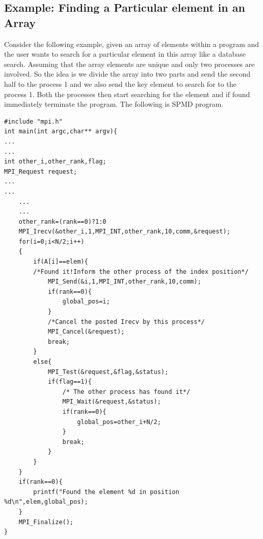 \documentclass[12pt]{book}
\begin{document}
\subsection{Example: Finding a Particular element in an Array}
Consider the following example, given an array of elements within a program and the user wants to search for a particular element in this array like a database search. Assuming that the array elements are unique and only two processes are involved. So the idea is we divide the array into two parts and send the second half to the process 1 and we also send the key element to search for to the process 1. Both the processes then start searching for the element and if found immediately terminate the program. The following is SPMD program.
\begin{lstlisting}
#include "mpi.h"
int main(int argc,char** argv){
...
...
int other_i,other_rank,flag;
MPI_Request request;
...
...
    ...
    ...
    other_rank=(rank==0)?1:0
    MPI_Irecv(&other_i,1,MPI_INT,other_rank,10,comm,&request);
    for(i=0;i<N/2;i++)
    {
        if(A[i]==elem){
        /*Found it!Inform the other process of the index position*/
            MPI_Send(&i,1,MPI_INT,other_rank,10,comm);
            if(rank==0){
                global_pos=i;
            }
            /*Cancel the posted Irecv by this process*/
            MPI_Cancel(&request);
            break;
        }
        else{
            MPI_Test(&request,&flag,&status);
            if(flag==1){
                /* The other process has found it*/
                MPI_Wait(&request,&status);
                if(rank==0){
                    global_pos=other_i+N/2;
                }
                break;
            }
        }
    }
    if(rank==0){
        printf("Found the element %d in position %d\n",elem,global_pos);
    }
    MPI_Finalize();
}
\end{lstlisting}
\end{document}
